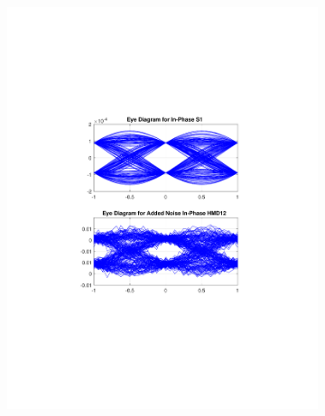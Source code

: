\begin{figure}[H]
	\centering
	\begin{subfigure}{.45\textwidth}
		\centering
		\includegraphics[clip, trim=5cm 4cm 5cm 4cm, width=\textwidth]{./sdf/m_qam_system/figures/eyes/if_n_nmf_45_60_rc.pdf}
	\end{subfigure}
	\begin{subfigure}{.45\textwidth}
		\centering

\end{subfigure}
\end{figure}

